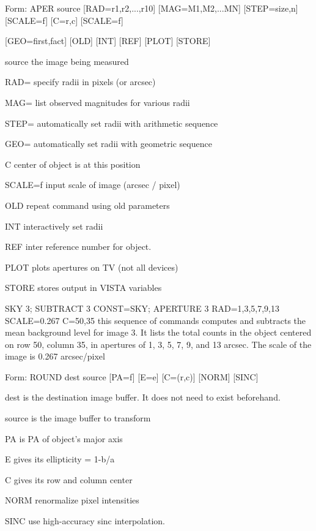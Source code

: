 {\newpage\clearpage
{}%
\begin{command}
  \item[Form: APER source {[RAD=r1,r2,...,r10]} {[MAG=M1,M2,...MN]} 
       {[STEP=size,n]} {[SCALE=f]} {[C=r,c]} {[SCALE=f]}\hfill]{}
  \item{{[GEO=first,fact]} {[OLD]} {[INT]} {[REF]} {[PLOT]} {[STORE]}}
  \item[source]{the image being measured}
  \item[RAD=]{specify radii in pixels (or arcsec)}
  \item[MAG=]{list observed magnitudes for various radii}
  \item[STEP=]{automatically set radii with arithmetic sequence}
  \item[GEO=]{automatically set radii with geometric sequence}
  \item[C]{center of object is at this position}
  \item[SCALE=f]{input scale of image (arcsec / pixel)}
  \item[OLD]{repeat command using old parameters}
  \item[INT]{interactively set radii}
  \item[REF]{inter reference number for object.}
  \item[PLOT]{plots apertures on TV (not all devices)}
  \item[STORE]{stores output in VISTA variables}
\end{command}%
\lthtmlfigureZ
\lthtmlcheckvsize\clearpage}

{\newpage\clearpage
{}%
\begin{example}
  \item[SKY 3; SUBTRACT 3 CONST=SKY; APERTURE 3 RAD=1,3,5,7,9,13
       SCALE=0.267 C=50,35\hfill]{this sequence of commands computes and
       subtracts the mean background level for image 3.  It lists the total
       counts in the object centered on row 50, column 35, in apertures of
       1, 3, 5, 7, 9, and 13 arcsec.  The scale of the image is 0.267
       arcsec/pixel}
\end{example}%
\lthtmlfigureZ
\lthtmlcheckvsize\clearpage}

{\newpage\clearpage
{}%
\begin{command}
  \item[Form: ROUND dest source {[PA=f]} {[E=e]} {[C=(r,c)]} {[NORM]} 
       {[SINC]}\hfill]{}
  \item[dest]{is the destination image buffer. It does not need
       to exist beforehand.}
  \item[source]{is the image buffer to transform}
  \item[PA]{is PA of object's major axis}
  \item[E]{gives its ellipticity = 1-b/a}
  \item[C]{gives its row and column center}
  \item[NORM]{renormalize pixel intensities}
  \item[SINC]{use high-accuracy sinc interpolation.}
\end{command}%
\lthtmlfigureZ
\lthtmlcheckvsize\clearpage}


